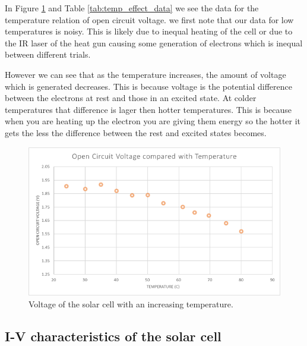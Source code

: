 In Figure \ref{fig:temp} and Table \ref{tab:temp_effect_data} we see the data for the temperature relation of open circuit voltage. we first note that our data for low temperatures is noisy. This is likely due to inequal heating of the cell or due to the IR laser of the heat gun causing some generation of electrons which is inequal between different trials.

However we can see that as the temperature increases, the amount of voltage which is generated decreases. This is because voltage is the potential difference between the electrons at rest and those in an excited state. At colder temperatures that difference is lager then hotter temperatures. This is because when you are heating up the electron you are giving them energy so the hotter it gets the less the difference between the rest and excited states becomes.

\begin{figure}[h]
    \centering
    \includegraphics[width=.75\linewidth]{figures/temp.png}
    \caption{Voltage of the solar cell with an increasing temperature.}
    \label{fig:temp}
\end{figure}

\clearpage

\subsection{I-V characteristics of the solar cell}


